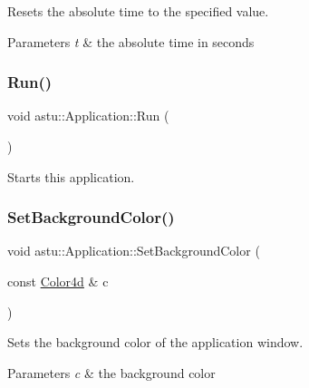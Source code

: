 Resets the absolute time to the specified value.


\begin{DoxyParams}{Parameters}
{\em t} & the absolute time in seconds \\
\hline
\end{DoxyParams}
\mbox{\label{classastu_1_1Application_a497dd50375ba6694479e0c57c8e32ffd}} 
\subsubsection{\texorpdfstring{Run()}{Run()}}
{\footnotesize\ttfamily void astu\+::\+Application\+::\+Run (\begin{DoxyParamCaption}{ }\end{DoxyParamCaption})}

Starts this application. \mbox{\label{classastu_1_1Application_ab1563999702c9d6ae6e707c4cd2c80c6}} 
\subsubsection{\texorpdfstring{Set\+Background\+Color()}{SetBackgroundColor()}}
{\footnotesize\ttfamily void astu\+::\+Application\+::\+Set\+Background\+Color (\begin{DoxyParamCaption}\item[{const \hyperlink{classastu_1_1Color}{Color4d} \&}]{c }\end{DoxyParamCaption})}

Sets the background color of the application window.


\begin{DoxyParams}{Parameters}
{\em c} & the background color \\
\hline
\end{DoxyParams}
\mbox{\label{classastu_1_1Application_aa311d33c9784e7326a9633336176fe05}} 
